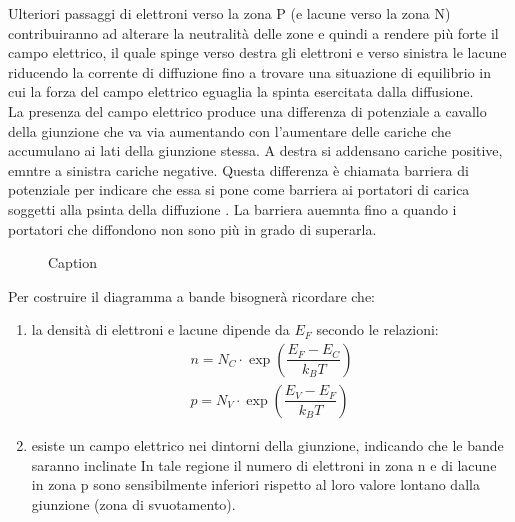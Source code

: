 %

Ulteriori passaggi di elettroni verso la zona P (e lacune verso la zona N) contribuiranno ad alterare la neutralità delle zone e quindi a rendere più forte il campo elettrico, il quale spinge verso destra gli elettroni e verso sinistra le lacune riducendo la corrente di diffuzione fino a trovare una situazione di equilibrio in cui la forza del campo elettrico eguaglia la spinta esercitata dalla diffusione.\\

La presenza del campo elettrico produce una differenza di potenziale a cavallo della giunzione che va via aumentando con l'aumentare delle cariche che accumulano ai lati della giunzione stessa. A destra si addensano cariche positive, emntre a sinistra cariche negative.
Questa differenza è chiamata barriera di potenziale per indicare che essa si pone come barriera ai portatori di carica soggetti alla psinta della diffuzione .
La barriera auemnta fino a quando i portatori che diffondono non sono più in grado di superarla.\\
\begin{figure}[hbt!]
    \centering
{}
    \caption{Caption}%
    \label{fig:enter_label}
\end{figure}

Per costruire il diagramma a bande bisognerà ricordare che:
\begin{enumerate}
    \item la densità di elettroni e lacune dipende da $E_F$ secondo le relazioni:
            \begin{align*}
                n=N_C \cdot \exp\left (\dfrac{E_F-E_C}{k_B T} \right)\\
                p=N_V \cdot \exp\left (\dfrac{E_V-E_F}{k_B T} \right)
            \end{align*}
    \item esiste un campo elettrico nei dintorni della giunzione, indicando che le bande saranno inclinate
            In tale regione il numero di elettroni in zona n e di lacune in zona p sono sensibilmente 
            inferiori rispetto al loro valore lontano dalla giunzione (zona di svuotamento).
            
\end{enumerate}

